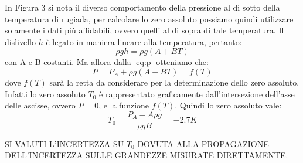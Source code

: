 In Figura 3 si nota il diverso comportamento della pressione al di sotto della temperatura di rugiada, per calcolare lo zero assoluto possiamo quindi utilizzare solamente i dati più affidabili, ovvero quelli al di sopra di tale temperatura.
Il dislivello $h$ è legato in maniera lineare alla temperatura, pertanto:
\begin{equation}
\rho gh = \rho g (A + B T)
\end{equation}
con A e B costanti.
Ma allora dalla \eqref{eq:p} otteniamo che:
\begin{equation}
P = P_A + \rho g (A + B T) = f (T)
\end{equation}
dove $f(T)$ sarà la retta da considerare per la determinazione dello zero assoluto.
Infatti lo zero assoluto $T_0$ è rappresentato graficamente dall'intersezione dell'asse delle ascisse, ovvero $P = 0$, e la funzione $f(T)$.
Quindi lo zero assoluto vale: 
\begin{equation}
T_0 = \frac{P_A - A \rho g}{\rho gB} = -2.7 K
\end{equation}

SI VALUTI L'INCERTEZZA SU $T_0$ DOVUTA ALLA PROPAGAZIONE DELL'INCERTEZZA SULLE GRANDEZZE MISURATE DIRETTAMENTE.